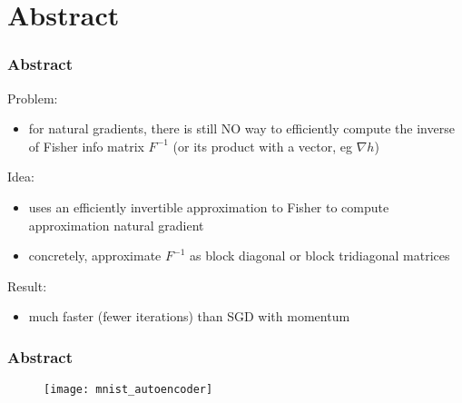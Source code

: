 \section{Abstract}

\begin{frame}
\frametitle{Abstract}

Problem:
\begin{itemize}
    \item for natural gradients, there is still NO way to efficiently compute
        the inverse of Fisher info matrix $F^{-1}$ (or its product with a vector, eg $\nabla h$)
\end{itemize}

Idea:
\begin{itemize}
    \item uses an efficiently invertible approximation to Fisher to compute approximation natural gradient
    \item concretely, approximate $F^{-1}$ as block diagonal or block tridiagonal matrices
\end{itemize}

Result:
\begin{itemize}
    \item much faster (fewer iterations) than SGD with momentum
\end{itemize}

\end{frame}

\begin{frame}
\frametitle{Abstract}
\begin{figure}
    \centering
    \texttt{[image: mnist\_autoencoder]}
\end{figure}
\end{frame}
